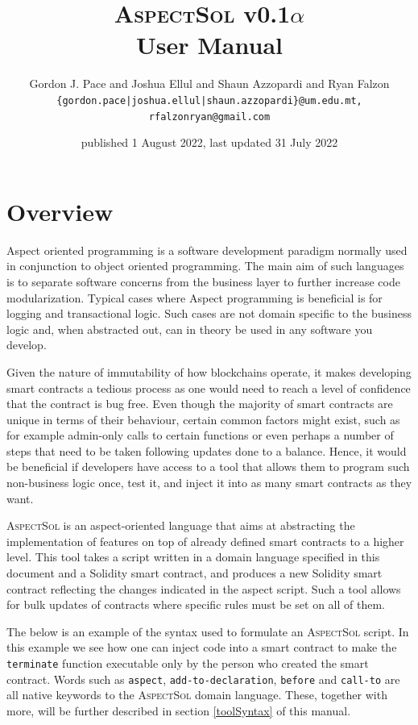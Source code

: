 \documentclass{article}
\newcommand{\AspectSol}{\textsc{AspectSol}\xspace}
\begin{document}
\title{\AspectSol v0.1$\alpha$\\User Manual}
\author{Gordon J. Pace and Joshua Ellul and Shaun Azzopardi and Ryan Falzon\\\texttt{\{gordon.pace|joshua.ellul|shaun.azzopardi\}@um.edu.mt, rfalzonryan@gmail.com}}
\date{published 1 August 2022, last updated 31 July 2022}
\maketitle

\tableofcontents

\section{Overview}	

Aspect oriented programming is a software development paradigm normally used in conjunction to object oriented programming. The main aim of such languages is to separate software concerns from the business layer to further increase code modularization. Typical cases where Aspect programming is beneficial is for logging and transactional logic. Such cases are not domain specific to the business logic and, when abstracted out, can in theory be used in any software you develop.

Given the nature of immutability of how blockchains operate, it makes developing smart contracts a tedious process as one would need to reach a level of confidence that the contract is bug free. Even though the majority of smart contracts are unique in terms of their behaviour, certain common factors might exist, such as for example admin-only calls to certain functions or even perhaps a number of steps that need to be taken following updates done to a balance. Hence, it would be beneficial if developers have access to a tool that allows them to program such non-business logic once, test it, and inject it into as many smart contracts as they want.

\AspectSol is an aspect-oriented language that aims at abstracting the implementation of features on top of already defined smart contracts to a higher level. This tool takes a script written in a domain language specified in this document and a Solidity smart contract, and produces a new Solidity smart contract reflecting the changes indicated in the aspect script. Such a tool allows for bulk updates of contracts where specific rules must be set on all of them.

The below is an example of the syntax used to formulate an \AspectSol script. In this example we see how one can inject code into a smart contract to make the \texttt{terminate} function executable only by the person who created the smart contract. Words such as \texttt{aspect}, \texttt{add-to-declaration}, \texttt{before} and \texttt{call-to} are all native keywords to the \AspectSol domain language. These, together with more, will be further described in section \ref{toolSyntax} of this manual.
\end{document}
